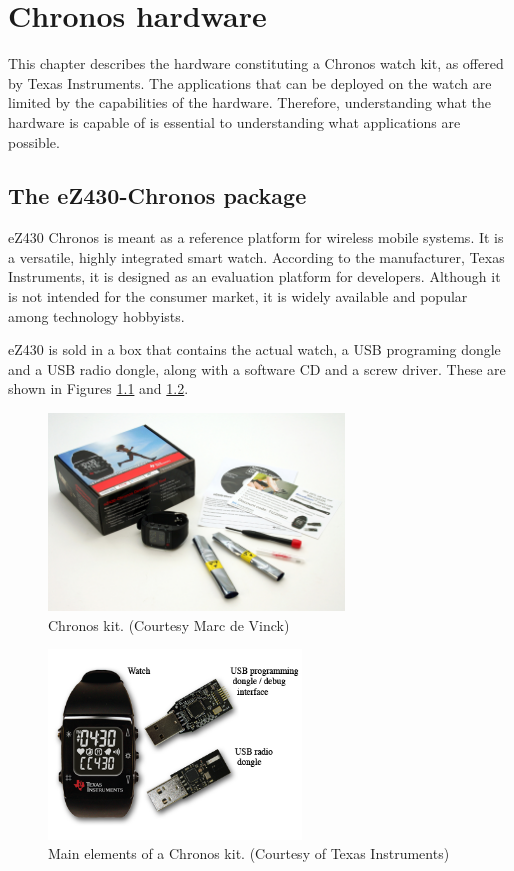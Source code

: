 \chapter{Chronos hardware}
\label{ch:chronos_hardware}

This chapter describes the hardware constituting a Chronos watch kit,
as offered by Texas Instruments. The applications that can be deployed
on the watch are limited by the capabilities of the hardware.
Therefore, understanding what the hardware is capable of is essential to
understanding what applications are possible.

\section{The eZ430-Chronos package}

eZ430 Chronos is meant as a reference platform for wireless mobile
systems.  It is a versatile, highly integrated smart watch.  According
to the manufacturer, Texas Instruments, it is designed  as an
evaluation platform for developers.  Although it is not intended for
the consumer market, it is widely available and popular among
technology hobbyists.

eZ430 is sold in a box that contains the actual watch, a USB programing dongle
and a USB radio dongle, along with a software CD and a screw driver.
These are shown in Figures \ref{fig:chronos_kit} and
\ref{fig:chronos_watch}.

\begin{figure}[h]
  \centering
  \includegraphics[width=0.7\textwidth]{img/chronos_kit.jpg}
  \caption{Chronos kit. (Courtesy Marc de
  Vinck)}
  \label{fig:chronos_kit}
\end{figure}

\begin{figure}[h]
  \centering
  \includegraphics[width=0.6\textwidth]{img/chronos_watch.png}
  \caption{Main elements of a Chronos kit. (Courtesy of Texas
  Instruments)}
  \label{fig:chronos_watch}
\end{figure}

